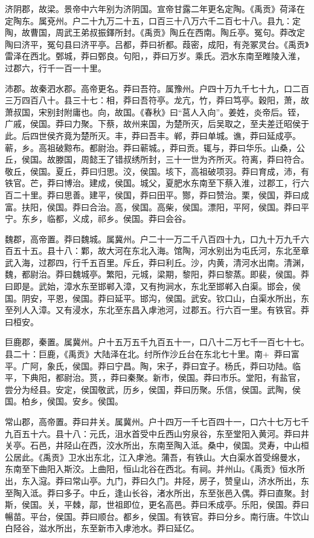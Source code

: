\documentclass[12pt,UTF8]{ctexbook}
\begin{document}
济阴郡，故梁。景帝中六年别为济阴国。宣帝甘露二年更名定陶。《禹贡》荷泽在定陶东。属兗州。户二十九万二十五，口百三十八万六千二百七十八。县九：定陶，故曹国，周武王弟叔振鐸所封。《禹贡》陶丘在西南。陶丘亭。冤句。莽改定陶曰济平，冤句县曰济平亭。吕都，莽曰祈都。葭密，成阳，有尧冢灵台。《禹贡》雷泽在西北。鄄城，莽曰鄄良。句阳，，莽曰万岁。乘氏。泗水东南至睢陵入淮，过郡六，行千一百一十里。



沛郡。故秦泗水郡。高帝更名。莽曰吾符。属豫州。户四十万九千七十九，口二百三万四百八十。县三十七：相，莽曰吾符亭。龙亢，竹，莽曰笃亭。穀阳，萧，故萧叔国，宋别封附庸也。向，故国。《春秋》曰“莒人入向”。姜姓，炎帝后。铚，广戚，侯国。莽曰力聚。下蔡，故州来国，为楚所灭，后吴取之，至夫差迁昭侯于此。后四世侯齐竟为楚所灭。丰，莽曰吾丰。郸，莽曰单城。谯，莽曰延成亭。蕲，乡。高祖破黥布。都尉治。莽曰蕲城。，莽曰贡。辄与，莽曰华乐。山桑，公丘，侯国。故滕国，周懿王了错叔绣所封，三十一世为齐所灭。符离，莽曰符合。敬丘，侯国。夏丘，莽曰归思。洨，侯国。垓下，高祖破项羽。莽曰育成，沛，有铁官。芒，莽曰博治。建成，侯国。城父，夏肥水东南至下蔡入淮，过郡工，行六百二十里。莽曰思善。建平，侯国，莽曰田平。酂，莽曰赞治。栗，侯国，莽曰成富。扶阳，侯国。莽曰合治。高，侯国。高柴，侯国。漂阳，平阿，侯国。莽曰平宁。东乡，临都，义成，祁乡。侯国。莽曰会谷。



魏郡，高帝置。莽曰魏城。属冀州。户二十一万二千八百四十九，口九十万九千六百五十五。县十八：鄴，故大河在东北入海。馆陶，河水别出为屯氏河，东北至章武入海，过郡四，行千五百里。斥丘，莽曰利丘。沙，内黄，清河水出南。清渊，魏，都尉治。莽曰魏城亭。繁阳，元城，梁期，黎阳，莽曰黎蒸。即裴，侯国。莽曰即是。武始，漳水东至邯郸入漳，又有拘涧水，东北至邯郸入白渠。邯会，侯国。阴安，平恩，侯国。莽曰延平。邯沟，侯国。武安。钦口山，白渠水所出，东至列人入漳。又有浸水，东北至东昌入虖池河，过郡五。行六百一里。有铁官。莽曰桓安。



巨鹿郡，秦置。属冀州。户十五万五千九百五十一，口八十二万七千一百七十七。县二十：巨鹿，《禹贡》大陆泽在北。纣所作沙丘台在东北七十里。南+，莽曰富平。广阿，象氏，侯国。莽曰宁昌。陶，宋子，莽曰宜子。杨氏，莽曰功陆。临平，下典阳，都尉治。贳，，莽曰秦聚。新市，侯国。莽曰市乐。堂阳，有盐官，尝分为经县。安定，侯国敬武，历乡，侯国，莽曰历聚。乐信，侯国。武陶，侯国。柏乡，侯国。安乡。侯国。



常山郡，高帝置。莽曰井关。属冀州。户十四万一千七百四十一，口六十七万七千九百五十六。县十八：元氏，沮水首受中丘西山穷泉谷，东至堂阳入黄河。莽曰井关亭。石邑，井陉山在西，洨水所出，东南至陶入泜。桑中，侯国。灵寿，中山桓公居此。《禹贡》卫水出东北，江入虖池。蒲吾，有铁山。大白渠水首受绵曼水，东南至下曲阳入斯洨。上曲阳，恒山北谷在西北。有祠。并州山。《禹贡》恒水所出，东入滱。莽曰常山亭。九门，莽曰久门。井陉，房子，赞皇山，济水所出，东至陶入泜。莽曰多子。中丘，逢山长谷，渚水所出，东至张邑入偶。莽曰直聚。封斯，侯国。关，平棘，鄗，世祖即位，更名高邑。莽曰禾成亭。乐阳，侯国。莽曰暢苗。平台，侯国。莽曰顺台。都乡，侯国。有铁官。莽曰分乡。南行唐。牛饮山白陉谷，滋水所出，东至新市入虖池水。莽曰延亿。
\end{document}
